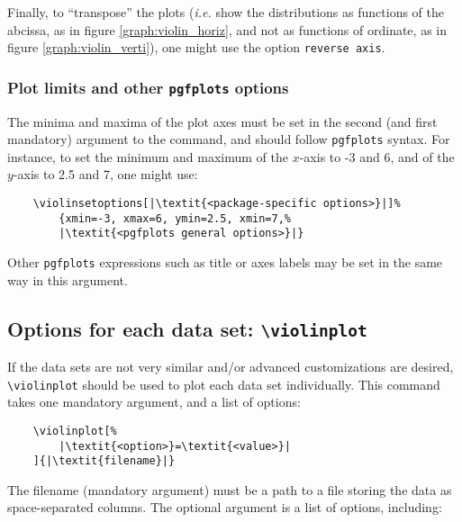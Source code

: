 \documentclass{article}
\begin{document}
Finally, to ``transpose'' the plots (\textit{i.e.} show the distributions
as functions of the abcissa, as in figure \ref{graph:violin_horiz},
and not as functions of ordinate, as in figure \ref{graph:violin_verti}),
one might use the option \texttt{reverse axis}.

\subsubsection{Plot limits and other \texttt{pgfplots} options}

The minima and maxima of the plot axes must be set in the second (and first
mandatory) argument to the command, and should follow \texttt{pgfplots}
syntax. For instance, to set the minimum and maximum of the $x$-axis
to -3 and 6, and of the $y$-axis to 2.5 and 7, one might use:

\begin{verbatim}
	\violinsetoptions[|\textit{<package-specific options>}|]%
		{xmin=-3, xmax=6, ymin=2.5, xmin=7,%
		|\textit{<pgfplots general options>}|}
\end{verbatim}

Other \texttt{pgfplots} expressions such as title or axes labels may be set
in the same way in this argument.

\subsection{Options for each data set: \texttt{{\textbackslash}violinplot}}

If the data sets are not very similar and/or advanced customizations
are desired, \texttt{{\textbackslash}violinplot} should be used to
plot each data set individually.
This command takes one mandatory argument, and a list of options:

\begin{verbatim}
	\violinplot[%
		|\textit{<option>}=\textit{<value>}|
	]{|\textit{filename}|}
\end{verbatim}

The filename (mandatory argument) must be a path to a file storing the data as
space-separated columns. The optional argument is a list of options, including:
\end{document}
